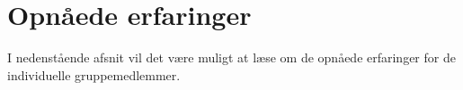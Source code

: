 \section{Opnåede erfaringer}
I nedenstående afsnit vil det være muligt at læse om de opnåede erfaringer for de individuelle gruppemedlemmer. 







